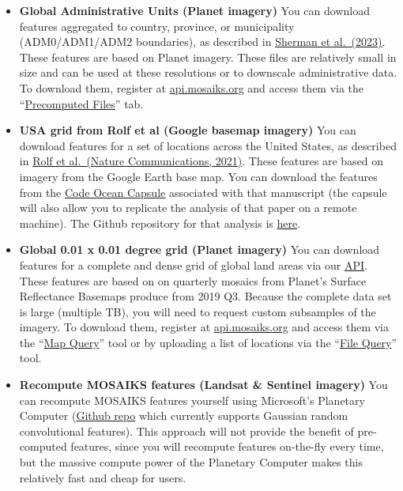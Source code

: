 \documentclass[
  letterpaper,
  DIV=11,
  numbers=noendperiod]{scrreprt}
\begin{document}
\begin{itemize}
\item
  \textbf{Global Administrative Units (Planet imagery)} You can download
  features aggregated to country, province, or municipality
  (ADM0/ADM1/ADM2 boundaries), as described in
  \href{https://www.mosaiks.org/hdi}{Sherman et al.~(2023)}. These
  features are based on Planet imagery. These files are relatively small
  in size and can be used at these resolutions or to downscale
  administrative data. To download them, register at
  \href{https://api.mosaiks.org/}{api.mosaiks.org} and access them via
  the ``\href{https://api.mosaiks.org/portal/precomputed/}{Precomputed
  Files}'' tab.
\item
  \textbf{USA grid from Rolf et al (Google basemap imagery)} You can
  download features for a set of locations across the United States, as
  described in
  \href{https://www.nature.com/articles/s41467-021-24638-z}{Rolf et
  al.~(Nature Communications, 2021)}. These features are based on
  imagery from the Google Earth base map. You can download the features
  from the \href{https://codeocean.com/capsule/6456296/tree/v2}{Code
  Ocean Capsule} associated with that manuscript (the capsule will also
  allow you to replicate the analysis of that paper on a remote
  machine). The Github repository for that analysis is
  \href{https://github.com/Global-Policy-Lab/mosaiks-paper}{here}.
\item
  \textbf{Global 0.01 x 0.01 degree grid (Planet imagery)} You can
  download features for a complete and dense grid of global land areas
  via our \href{https://api.mosaiks.org/}{API}. These features are based
  on on quarterly mosaics from Planet's Surface Reflectance Basemaps
  produce from 2019 Q3. Because the complete data set is large (multiple
  TB), you will need to request custom subsamples of the imagery. To
  download them, register at
  \href{https://api.mosaiks.org/}{api.mosaiks.org} and access them via
  the ``\href{https://api.mosaiks.org/portal/map_query/}{Map Query}''
  tool or by uploading a list of locations via the
  ``\href{https://api.mosaiks.org/portal/file_query/}{File Query}''
  tool.
\item
  \textbf{Recompute MOSAIKS features (Landsat \& Sentinel imagery)} You
  can recompute MOSAIKS features yourself using Microsoft's Planetary
  Computer
  (\href{https://github.com/microsoft/PlanetaryComputerExamples/blob/main/tutorials/mosaiks.ipynb}{Github
  repo} which currently supports Gaussian random convolutional
  features). This approach will not provide the benefit of pre-computed
  features, since you will recompute features on-the-fly every time, but
  the massive compute power of the Planetary Computer makes this
  relatively fast and cheap for users.
\end{itemize}
\end{document}
